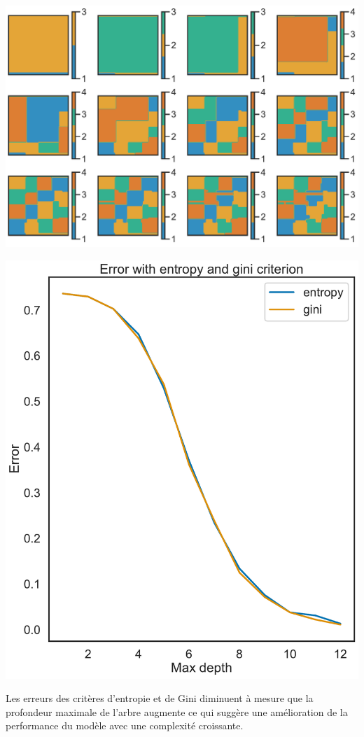 \documentclass[
  letterpaper,
  DIV=11,
  numbers=noendperiod]{scrartcl}
\begin{document}
\includegraphics{TP_files/figure-pdf/cell-5-output-2.pdf}

\includegraphics{TP_files/figure-pdf/cell-5-output-3.pdf}

Les erreurs des critères d'entropie et de Gini diminuent à mesure que la
profondeur maximale de l'arbre augmente ce qui suggère une amélioration
de la performance du modèle avec une complexité croissante.
\end{document}
